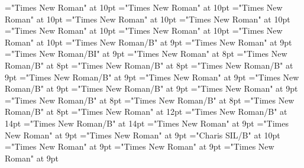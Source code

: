 \documentclass[gps1,twoside]{article}
\begin{document}
\font\complexformtypesvisiblecomplexformbackrefvisiblecomplexformbackrefsminorentryvariantafter="Times New Roman" at 10pt
\font\reverseabbrcomplexformtypecomplexformtypesvisiblecomplexformbackrefvisiblecomplexformbackrefsminorentryvariantbefore="Times New Roman" at 10pt
\font\headwordvisiblecomplexformbackrefvisiblecomplexformbackrefsminorentryvariantbefore="Times New Roman" at 10pt
\font{}="Times New Roman" at 10pt
\font{}="Times New Roman" at 10pt
\font\owningentrysummarydefinitionvisiblecomplexformbackrefvisiblecomplexformbackrefsminorentryvariantbefore="Times New Roman" at 10pt
\font\spanowningentrysummarydefinitionvisiblecomplexformbackrefvisiblecomplexformbackrefsminorentryvariantfirstchildbefore="Times New Roman" at 10pt
\font\spanowningentrysummarydefinitionvisiblecomplexformbackrefvisiblecomplexformbackrefsminorentryvariantlastchildafter="Times New Roman" at 10pt
\font\xitemxitemcrossrefbefore="Times New Roman/B" at 9pt
\font\xitemxitemcrossreftargetsbefore="Times New Roman" at 9pt
\font\xitemxitemcrossreftypebefore="Times New Roman/BI" at 9pt
\font\xitemxitemexamplebefore="Times New Roman" at 8pt
\font\xitemxitemheadwordbefore="Times New Roman/B" at 8pt
\font\xitemxitemheadwordminorbefore="Times New Roman/B" at 8pt
\font\xitemxitemmainentryrefbefore="Times New Roman/B" at 9pt
\font\xitemxitemmainentryrefminorbefore="Times New Roman/B" at 9pt
\font\xitemxitempronunciationminorbefore="Times New Roman" at 9pt
\font\xitemxitemsensecrossrefbefore="Times New Roman/B" at 9pt
\font\xitemxitemsensemainentryrefbefore="Times New Roman/B" at 9pt
\font\xitemxitemtranslationbefore="Times New Roman" at 9pt
\font\xitemxitemheadwordsubbefore="Times New Roman/B" at 8pt
\font\xitemxitemLexEntrypublishRootMinorPrimaryTargetMLHeadWordPubbefore="Times New Roman/B" at 8pt
\font\xitemxitemLexEntrypublishStemMinorPrimaryTargetMLHeadWordPubbefore="Times New Roman/B" at 8pt
\font\xitemtpi="Times New Roman" at 12pt
\font{}="Times New Roman/B" at 14pt
\font{}="Times New Roman/B" at 14pt
\font{}="Times New Roman" at 9pt
\font\diventryletData="Times New Roman" at 9pt
\font\spandiventryletData="Times New Roman" at 9pt
\font\spanbzhspandiventryletData="Charis SIL/B" at 10pt
\font\spanmainheadwordentrylastchildafterspandiventryletData="Times New Roman" at 9pt
\font\sensesentryafterdiventryletData="Times New Roman" at 9pt
\font\spanspandiventryletData="Times New Roman" at 9pt
\end{document}
